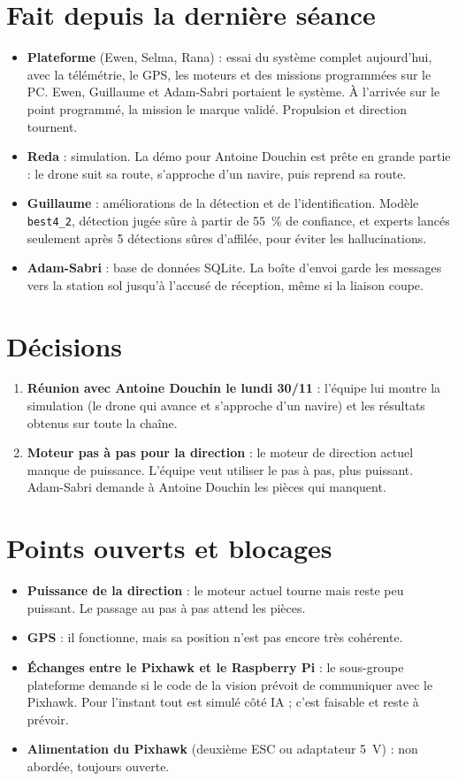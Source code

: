 \documentclass[10pt,a4paper]{article}
\begin{document}
\section{Fait depuis la dernière séance}
\begin{itemize}
  \item \textbf{Plateforme} (Ewen, Selma, Rana) : essai du système complet aujourd'hui, avec la télémétrie, le GPS, les moteurs et des missions programmées sur le PC. Ewen, Guillaume et Adam-Sabri portaient le système. À l'arrivée sur le point programmé, la mission le marque validé. Propulsion et direction tournent.
  \item \textbf{Reda} : simulation. La démo pour Antoine Douchin est prête en grande partie : le drone suit sa route, s'approche d'un navire, puis reprend sa route.
  \item \textbf{Guillaume} : améliorations de la détection et de l'identification. Modèle \texttt{best4\_2}, détection jugée sûre à partir de 55~\% de confiance, et experts lancés seulement après 5 détections sûres d'affilée, pour éviter les hallucinations.
  \item \textbf{Adam-Sabri} : base de données SQLite. La boîte d'envoi garde les messages vers la station sol jusqu'à l'accusé de réception, même si la liaison coupe.
\end{itemize}

\section{Décisions}
\begin{enumerate}[label={\color{cExp}\bfseries\arabic*.}]
  \item \textbf{Réunion avec Antoine Douchin le lundi 30/11} : l'équipe lui montre la simulation (le drone qui avance et s'approche d'un navire) et les résultats obtenus sur toute la chaîne.
  \item \textbf{Moteur pas à pas pour la direction} : le moteur de direction actuel manque de puissance. L'équipe veut utiliser le pas à pas, plus puissant. Adam-Sabri demande à Antoine Douchin les pièces qui manquent.
\end{enumerate}

\section{Points ouverts et blocages}
\begin{itemize}
  \item \textbf{Puissance de la direction} : le moteur actuel tourne mais reste peu puissant. Le passage au pas à pas attend les pièces.
  \item \textbf{GPS} : il fonctionne, mais sa position n'est pas encore très cohérente.
  \item \textbf{Échanges entre le Pixhawk et le Raspberry Pi} : le sous-groupe plateforme demande si le code de la vision prévoit de communiquer avec le Pixhawk. Pour l'instant tout est simulé côté IA ; c'est faisable et reste à prévoir.
  \item \textbf{Alimentation du Pixhawk} (deuxième ESC ou adaptateur 5~V) : non abordée, toujours ouverte.
\end{itemize}
\end{document}
